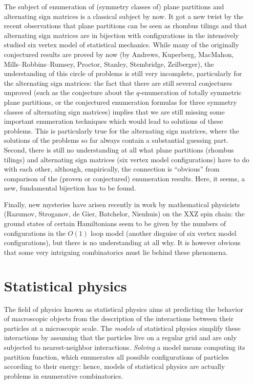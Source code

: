 \documentclass{amsart}
\begin{document}
The subject of enumeration of (symmetry classes of)
plane partitions and alternating sign matrices is a classical subject
by now. It got a new twist by the recent observations that plane
partitions
can be seen as rhombus tilings and that
alternating sign matrices are in bijection with configurations in
the intensively studied six vertex model of statistical mechanics.
While many of the originally conjectured results are
proved by now (by Andrews, Kuperberg,
MacMahon, Mills--Robbins--Rumsey,
Proctor, Stanley, Stembridge, Zeilberger), the understanding
of this circle of problems is still very incomplete, particularly for
the alternating sign matrices: the fact that there are
still several conjectures unproved
(such as the conjecture about the $q$-enumeration of totally symmetric
plane partitions, or the conjectured enumeration formulas
for three symmetry classes of
alternating sign matrices) implies that we are still missing some
important enumeration techniques which would lead to solutions of
these problems. This is particularly true for the alternating sign
matrices, where the solutions of the problems so far always contain
a substantial guessing part. Second, there is still no understanding
at all what plane partitions (rhombus tilings) and
alternating sign matrices (six vertex model configurations) have to
do with each other, although, empirically, the connection is
``obvious'' from comparison of the (proven or conjectured) enumeration
results. Here, it seems, a new, fundamental bijection has to be found.

Finally, new mysteries have arisen recently in work by mathematical
physicists (Razumov, Stroganov, de Gier, Batchelor, Nienhuis) on
the XXZ spin chain: the ground states of certain Hamiltonians
seem to be given by the numbers of configurations in the $O(1)$ loop
model (another disguise of six vertex model configurations), but there
is no understanding at all why.
It is however obvious that some very intriguing combinatorics must lie
behind these phenomena.


\section{Statistical physics}
The field of physics known as statistical physics aims at predicting
the behavior of macroscopic objects from the description of the
interactions between their particles at a microscopic scale. The {\em
  models\/} of statistical physics simplify these interactions by
assuming that the particles live on a regular grid and are only
subjected to nearest-neighbor interactions. {\em Solving\/} a model
means computing its partition function, which enumerates all possible
configurations of particles according to their energy: hence, models
of statistical physics are actually problems in enumerative
combinatorics.
\end{document}
